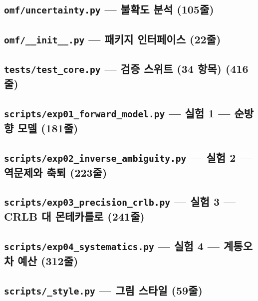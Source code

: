 \documentclass[10pt,a4paper]{article}
\begin{document}
\subsection{\texttt{omf/uncertainty.py} — 불확도 분석 (105줄)}

\subsection{\texttt{omf/\_\_init\_\_.py} — 패키지 인터페이스 (22줄)}

\subsection{\texttt{tests/test\_core.py} — 검증 스위트 (34 항목) (416줄)}

\subsection{\texttt{scripts/exp01\_forward\_model.py} — 실험 1 — 순방향 모델 (181줄)}

\subsection{\texttt{scripts/exp02\_inverse\_ambiguity.py} — 실험 2 — 역문제와 축퇴 (223줄)}

\subsection{\texttt{scripts/exp03\_precision\_crlb.py} — 실험 3 — CRLB 대 몬테카를로 (241줄)}

\subsection{\texttt{scripts/exp04\_systematics.py} — 실험 4 — 계통오차 예산 (312줄)}

\subsection{\texttt{scripts/\_style.py} — 그림 스타일 (59줄)}

\end{document}
